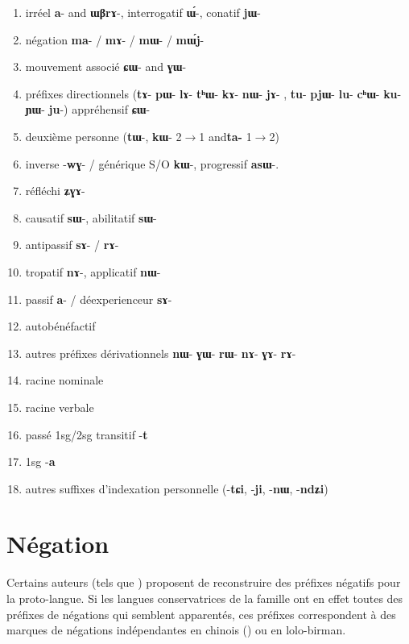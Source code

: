 \documentclass[oldfontcommands,oneside,a4paper,11pt]{article}
\newcommand{\ipa}[1]{{\phon\textbf{\mbox{#1}}}} %
\begin{document}
\begin{landscape}
\begin{multicols}{2}
\begin{enumerate}
\item irréel  \ipa{a}- and \ipa{ɯβrɤ}-, interrogatif \ipa{ɯ́}-, conatif \ipa{jɯ}-
\item négation \ipa{ma}- / \ipa{mɤ}- / \ipa{mɯ}- / \ipa{mɯ́j}-
\item  mouvement associé  \ipa{ɕɯ}- and \ipa{ɣɯ}- 
\item préfixes directionnels (\ipa{tɤ}-  \ipa{pɯ}-  \ipa{lɤ}-   \ipa{tʰɯ}-  \ipa{kɤ}-   \ipa{nɯ}-   \ipa{jɤ}- ,  \ipa{tu}-   \ipa{pjɯ}-   \ipa{lu}-   \ipa{cʰɯ}-   \ipa{ku}-   \ipa{ɲɯ}-   \ipa{ju}-)   appréhensif \ipa{ɕɯ}-
\item deuxième personne (\ipa{tɯ}-, \ipa{kɯ}- 2$\rightarrow$1 and\ipa{ta-} 1$\rightarrow$2)
\item inverse -\ipa{wɣ}- / générique S/O \ipa{kɯ}-, progressif \ipa{asɯ}-. 
\item réfléchi \ipa{ʑɣɤ}- 
\item causatif \ipa{sɯ}-, abilitatif \ipa{sɯ}-
\item  antipassif  \ipa{sɤ}- / \ipa{rɤ}-
\item  tropatif \ipa{nɤ}-, applicatif \ipa{nɯ}-
\item passif \ipa{a}- / déexperienceur \ipa{sɤ}-
\item autobénéfactif
\item autres préfixes dérivationnels \ipa{nɯ}- \ipa{ɣɯ}- \ipa{rɯ}- \ipa{nɤ}- \ipa{ɣɤ}- \ipa{rɤ}-
\item racine nominale
\item racine verbale
\item passé 1sg/2sg transitif -\ipa{t} 
\item 1sg -\ipa{a}
\item autres suffixes d'indexation personnelle (-\ipa{tɕi}, -\ipa{ji}, -\ipa{nɯ}, -\ipa{ndʑi})
\end{enumerate}


\end{multicols}
  \end{landscape}

 



\section{Négation} 
Certains auteurs (tels que \citealt{lapolla03}) proposent de reconstruire des préfixes négatifs pour la proto-langue. Si les langues conservatrices de la famille ont en effet toutes des préfixes de négations qui semblent apparentés, ces préfixes correspondent à des marques de négations indépendantes en chinois (\citealt{djamouri91negation}) ou en lolo-birman. 
\end{document}
